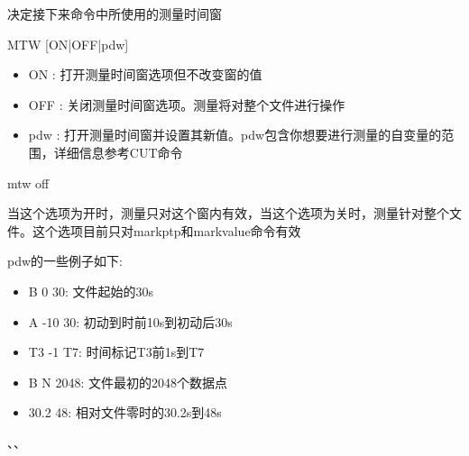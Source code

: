 \label{cmd:mtw}

决定接下来命令中所使用的测量时间窗

\begin{SACSTX}
MTW [ON|OFF|pdw]
\end{SACSTX}

\begin{itemize}
\item ON : 打开测量时间窗选项但不改变窗的值 
\item OFF : 关闭测量时间窗选项。测量将对整个文件进行操作 
\item pdw : 打开测量时间窗并设置其新值。pdw包含你想要进行测量的自变量的范围，详细信息参考CUT命令 
\end{itemize}

\begin{SACDFT}
mtw off
\end{SACDFT}

当这个选项为开时，测量只对这个窗内有效，当这个选项为关时，测量针对整个文件。这个选项目前只对markptp和markvalue命令有效

pdw的一些例子如下:
\begin{itemize}
\item B 0 30: 文件起始的30s
\item A -10 30: 初动到时前10s到初动后30s
\item T3 -1 T7: 时间标记T3前1s到T7
\item B N 2048: 文件最初的2048个数据点
\item 30.2 48: 相对文件零时的30.2s到48s
\end{itemize}

、、
